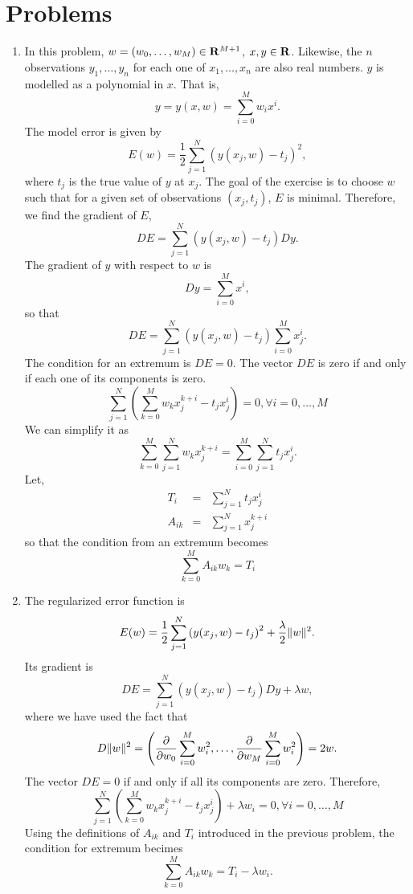 \section{Problems}\label{c1p}
\begin{enumerate}
\item In this problem, $w = (w_0, \ldots, w_M) \in \mathbf{R}^{M+1}$, $x, y \in \mathbf{R}$. Likewise, the $n$
observations $y_1, \ldots, y_n$ for each one of $x_1, \ldots, x_n$ are also real numbers. $y$
is modelled as a polynomial in $x$. That is,
\begin{equation}\label{c1pe1}
y = y(x, w) = \sum_{i=0}^Mw_ix^i.
\end{equation}
The model error is given by
\begin{equation}\label{c1pe2}
E(w) = \frac{1}{2}\sum_{j=1}^N \left(y(x_j, w) - t_j\right)^2,
\end{equation}
where $t_j$ is the true value of $y$ at $x_j$. The goal of the exercise is to choose $w$ such 
that for a given set of observations $(x_j, t_j)$, $E$ is minimal. Therefore, we find the
gradient of $E$,
\[
DE = \sum_{j=1}^N\left(y(x_j, w) - t_j\right)Dy.
\]
The gradient of $y$ with respect to $w$ is
\[
Dy = \sum_{i=0}^M x^i,
\]
so that
\[
DE = \sum_{j=1}^N\left(y(x_j, w) - t_j\right)\sum_{i=0}^M x_j^i.
\]
The condition for an extremum is $DE = 0$. The vector $DE$ is zero if and only if each one
of its components is zero.
\[
\sum_{j=1}^N\left(\sum_{k=0}^M w_k x_j^{k+i} - t_jx_j^i\right) = 0, \forall i = 0, \ldots, M
\]
We can simplify it as
\[
\sum_{k=0}^M \sum_{j=1}^N w_k x_j^{k+i} = \sum_{i=0}^M\sum_{j=1}^N t_jx_j^i.
\]
Let,
\begin{eqnarray*}
T_i &=& \sum_{j=1}^N t_jx_j^i \\
A_{ik} &=& \sum_{j=1}^N x_j^{k+i}
\end{eqnarray*}
so that the condition from an extremum becomes
\[
\sum_{k=0}^M A_{ik}w_k = T_i
\]

\item The regularized error function is
\begin{equation}\label{c1pe3}
E(w) = \frac{1}{2}\sum_{j=1}^N \left(y(x_j, w) - t_j\right)^2 + \frac{\lambda}{2}\lVert w\rVert^2.
\end{equation}
Its gradient is
\[
DE = \sum_{j=1}^N\left(y(x_j, w) - t_j\right)Dy + \lambda w,
\]
where we have used the fact that 
\[
D\lVert w\rVert^2 = \left(\frac{\partial}{\partial w_0}\sum_{i=0}^M w_i^2, \ldots, \frac{\partial}{\partial w_M}\sum_{i=0}^M w_i^2\right) = 2w.
\]
The vector $DE = 0$ if and only if all its components are zero. Therefore,
\[
\sum_{j=1}^N\left(\sum_{k=0}^M w_k x_j^{k+i} - t_jx_j^i\right) + \lambda w_i = 0, \forall i = 0, \ldots, M
\]
Using the definitions of $A_{ik}$ and $T_i$ introduced in the previous problem, the condition
for extremum becimes
\[
\sum_{k=0}^M A_{ik}w_k = T_i - \lambda w_i.
\]


\end{enumerate}

